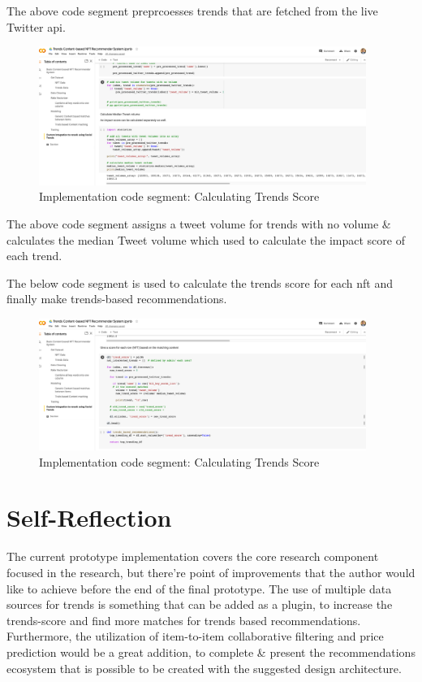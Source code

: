 The above code segment preprcoesses trends that are fetched from the live Twitter \gls{api}.

\begin{figure}[h!]
\centering
\includegraphics[width=0.95\textwidth]{images/Implementation/code/tweet-volume calculation.png}
\caption{Implementation code segment: Calculating Trends Score}
\label{fig:code-tweet-volume-extraction}
\end{figure}

The above code segment assigns a tweet volume for trends with no volume \& calculates the median Tweet volume which used to calculate the impact score of each trend.

The below code segment is used to calculate the trends score for each \gls{nft} and finally make trends-based recommendations.
\begin{figure}[h!]
\centering
\includegraphics[width=0.95\textwidth]{images/Implementation/code/calculating trends score.png}
\caption{Implementation code segment: Calculating Trends Score}
\label{fig:code-trends-score}
\end{figure}


\section{Self-Reflection}
The current prototype implementation covers the core research component focused in the research, but there're point of improvements that the author would like to achieve before the end of the final prototype. The use of multiple data sources for trends is something that can be added as a plugin, to increase the trends-score and find more matches for trends based recommendations. Furthermore, the utilization of item-to-item collaborative filtering and price prediction would be a great addition, to complete \& present the recommendations ecosystem that is possible to be created with the suggested design architecture.

